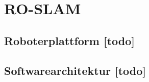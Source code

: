 \begin{comment}
------------------------------------------------------------------------------------------
- \cite{kurth2003experimental}
	- Numerically, we can evaluate the performance of the dead reckoning and Kalman lter localization methods by considering the cross-track error (XTE). That is, for each pose we measure how far left or right of the true position our estimation is, orthogonal to the true heading. We compile these errors for every point along the path, then nd the maximum value along with the mean and standard deviation of the errors to produce the evaluative statistics in Table 1.
	- https://de.wikipedia.org/wiki/Querabweichung
- Diagramme
	- \cite{kurth2003experimental}
		- Fig. 5: (1) The ground truth path with tags indicated by circles. The numbers indicate how many range measurements were received from each tag over the duration of Test 1. (2) The path estimate from dead reckoning alone. (3) The path estimate from localization using a Kalman lter. The lter fuses data from odometry and a gyro with absolute measurements from RF tags to produce this path estimate. Numerical results are given in Table 1. (X: position in x(m), Y: position in y(m), Ground truth path with tag locations, Dead reckoning path, Kalman filter localization path)
\end{comment}
\chapter{RO-SLAM}\label{ch:ro_slam}


\begin{comment}
------------------------------------------------------------------------------------------
\end{comment}
\section{Roboterplattform [todo]}


\begin{comment}
------------------------------------------------------------------------------------------
\end{comment}
\section{Softwarearchitektur [todo]}


\begin{comment}
------------------------------------------------------------------------------------------
\end{comment}
